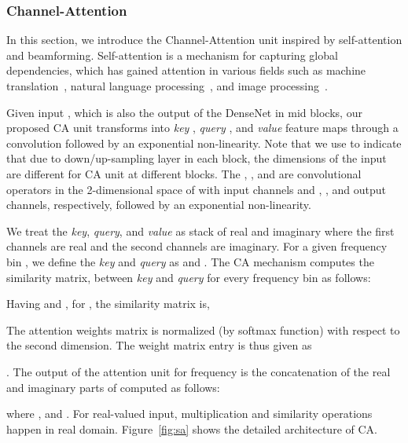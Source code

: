 \documentclass{article}
\begin{document}
\subsubsection{Channel-Attention}
\label{sec:sa}

In this section, we introduce the Channel-Attention unit inspired by self-attention and beamforming. Self-attention is a mechanism for capturing global dependencies, which has gained attention in various fields such as machine translation~\cite{bahdanau2014neural}, natural language processing~\cite{parikhetal2016decomposable}, and image processing~\cite{saGANs}. 


Given input , which is also the output of the DenseNet in mid blocks, our proposed CA unit transforms  into {\it key} , {\it query} , and {\it value}  feature maps through a convolution followed by an exponential non-linearity. Note that we use  to indicate that due to down/up-sampling layer in each block, the dimensions of the input are different for CA unit at different blocks. The , , and  are  convolutional operators in the 2-dimensional space of  with  input channels and , , and  output channels, respectively, followed by an exponential non-linearity.

We treat the {\it key}, {\it query}, and {\it value} as stack of real and imaginary where the first  channels are real and the second  channels are imaginary. For a given frequency bin , we define the {\it key} and {\it query} as  and . The CA mechanism computes the similarity matrix,  between {\it key} and {\it query} for every frequency bin as follows:


Having  and ,  for , the similarity matrix is,

The attention weights matrix  is normalized (by softmax function)  with respect to the second dimension. The weight matrix entry is thus given as 

. The output of the attention unit for frequency  is the concatenation of the real and imaginary parts of  computed as follows:

where , and . For real-valued input, multiplication and similarity operations happen in real domain. Figure~\ref{fig:sa} shows the detailed architecture of CA. 
\end{document}
